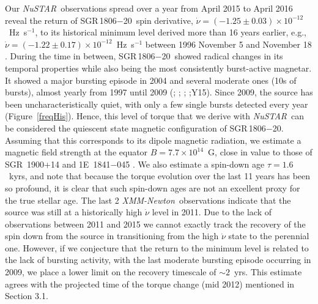 \documentclass[twocolumn]{aastex6}
\newcommand {\xmm} {\textsl{XMM-Newton}}
\newcommand {\nustar} {\textsl{NuSTAR}}
\def \src {SGR\,1806$-$20}
\begin{document}
Our \nustar\ observations spread over a year from April 2015 to April
2016 reveal the return of \src\ spin derivative,
$\dot{\nu}=(-1.25\pm0.03)\times10^{-12}$~Hz~s$^{-1}$, to its historical
minimum level derived more than 16 years earlier, e.g., 
$\dot{\nu}=(-1.22\pm0.17)\times10^{-12}$~Hz~s$^{-1}$ between 1996
November 5 and November 18 \citep{woods00ApJ:1806}. During the time
in between, \src\ showed radical changes in its temporal properties
while also being the most consistently burst-active magnetar.
It showed a major bursting episode in 2004 and several moderate ones
(10s of bursts), almost yearly from 1997 until 2009
(\citealt{woods02ApJ:1900}; \citealt{woods02ApJ:1900};
\citealt{mereghetti05ApJ:1806}; \citealt{woods07ApJ:1806};Y15). Since
2009, the source has been uncharacteristically quiet, with only
a few single bursts detected every year (Figure~\ref{freqHis}). Hence, this
level of torque that we derive with \nustar\ can be considered the
quiescent state magnetic configuration of \src. Assuming that this
corresponds to its dipole magnetic radiation, we estimate a magnetic
field strength at the equator $B=7.7\times10^{14}$~G, close in value
to those of SGR~1900+14 \citep{woods99ApJ:1900,mereghetti06ApJ:1900}
and 1E~1841$-$045 \citep{dib14ApJ}. We also estimate a spin-down age
$\tau=1.6$~kyrs, and note that because the torque evolution 
over the last 11 years has been so profound, it is clear that such spin-down 
ages are not an excellent proxy for the true stellar age. 
The last 2 \xmm\ observations indicate that the
source was still at a historically high $\dot{\nu}$ level in 2011. 
Due to the lack of observations between 2011 and 2015
we cannot exactly track the recovery of the spin down from the
source in transitioning from the high $\dot{\nu}$ state to 
the perennial one. However, if we
conjecture that the return to the minimum level is related to the lack
of bursting activity, with the last moderate bursting episode
occurring in 2009, we place a lower limit on the recovery timescale
of $\sim2$~yrs. This estimate agrees with the projected time of the torque change (mid 2012) mentioned in Section 3.1.
\end{document}
